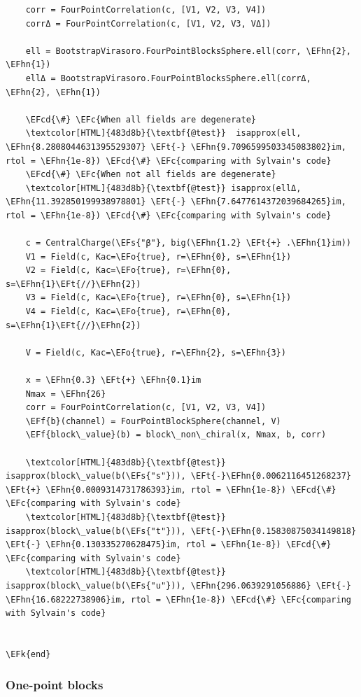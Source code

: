 \documentclass[a4paper]{article}
\numberwithin{equation}{section}
\newcommand{\EFc}[1]{\textcolor{EFc}{#1}} %
\newcommand{\EFcd}[1]{\textcolor{EFcd}{#1}} %
\newcommand{\EFs}[1]{\textcolor{EFs}{#1}} %
\newcommand{\EFk}[1]{\textcolor{EFk}{#1}} %
\newcommand{\EFf}[1]{\textcolor{EFf}{#1}} %
\newcommand{\EFt}[1]{\textcolor{EFt}{#1}} %
\newcommand{\EFo}[1]{\textcolor{EFo}{#1}} %
\newcommand{\EFhn}[1]{\textcolor{EFhn}{#1}} %
\begin{document}
\begin{itemize}
\begin{Code}
\begin{Verbatim}
    corr = FourPointCorrelation(c, [V1, V2, V3, V4])
    corrΔ = FourPointCorrelation(c, [V1, V2, V3, VΔ])

    ell = BootstrapVirasoro.FourPointBlocksSphere.ell(corr, \EFhn{2}, \EFhn{1})
    ellΔ = BootstrapVirasoro.FourPointBlocksSphere.ell(corrΔ, \EFhn{2}, \EFhn{1})

    \EFcd{\#} \EFc{When all fields are degenerate}
    \textcolor[HTML]{483d8b}{\textbf{@test}}  isapprox(ell, \EFhn{8.2808044631395529307} \EFt{-} \EFhn{9.7096599503345083802}im, rtol = \EFhn{1e-8}) \EFcd{\#} \EFc{comparing with Sylvain's code}
    \EFcd{\#} \EFc{When not all fields are degenerate}
    \textcolor[HTML]{483d8b}{\textbf{@test}} isapprox(ellΔ, \EFhn{11.392850199938978801} \EFt{-} \EFhn{7.6477614372039684265}im, rtol = \EFhn{1e-8}) \EFcd{\#} \EFc{comparing with Sylvain's code}

    c = CentralCharge(\EFs{"β"}, big(\EFhn{1.2} \EFt{+} .\EFhn{1}im))
    V1 = Field(c, Kac=\EFo{true}, r=\EFhn{0}, s=\EFhn{1})
    V2 = Field(c, Kac=\EFo{true}, r=\EFhn{0}, s=\EFhn{1}\EFt{//}\EFhn{2})
    V3 = Field(c, Kac=\EFo{true}, r=\EFhn{0}, s=\EFhn{1})
    V4 = Field(c, Kac=\EFo{true}, r=\EFhn{0}, s=\EFhn{1}\EFt{//}\EFhn{2})

    V = Field(c, Kac=\EFo{true}, r=\EFhn{2}, s=\EFhn{3})

    x = \EFhn{0.3} \EFt{+} \EFhn{0.1}im
    Nmax = \EFhn{26}
    corr = FourPointCorrelation(c, [V1, V2, V3, V4])
    \EFf{b}(channel) = FourPointBlockSphere(channel, V)
    \EFf{block\_value}(b) = block\_non\_chiral(x, Nmax, b, corr)

    \textcolor[HTML]{483d8b}{\textbf{@test}} isapprox(block\_value(b(\EFs{"s"})), \EFt{-}\EFhn{0.0062116451268237} \EFt{+} \EFhn{0.0009314731786393}im, rtol = \EFhn{1e-8}) \EFcd{\#} \EFc{comparing with Sylvain's code}
    \textcolor[HTML]{483d8b}{\textbf{@test}} isapprox(block\_value(b(\EFs{"t"})), \EFt{-}\EFhn{0.15830875034149818} \EFt{-} \EFhn{0.130335270628475}im, rtol = \EFhn{1e-8}) \EFcd{\#} \EFc{comparing with Sylvain's code}
    \textcolor[HTML]{483d8b}{\textbf{@test}} isapprox(block\_value(b(\EFs{"u"})), \EFhn{296.0639291056886} \EFt{-} \EFhn{16.68222738906}im, rtol = \EFhn{1e-8}) \EFcd{\#} \EFc{comparing with Sylvain's code}


\EFk{end}
\end{Verbatim}
\end{Code}
\end{itemize}
\subsubsection*{One-point blocks}
\label{sec:org1ed0323}
\end{document}
